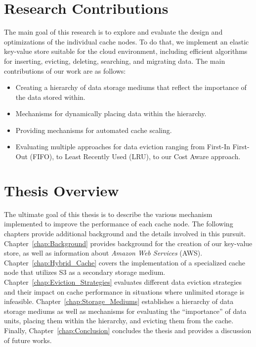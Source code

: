 \section{Research Contributions} %
\label{sec:Research_Contributions}
The main goal of this research is to explore and evaluate the design and
optimizations of the individual cache nodes. To do that, we implement an
elastic key-value store suitable for the cloud environment, including efficient
algorithms for inserting, evicting, deleting, searching, and migrating data.
The main contributions of our work are as follows:
\begin{itemize}
  \item Creating a hierarchy of data storage mediums that reflect the
    importance of the data stored within.
  \item Mechanisms for dynamically placing data within the hierarchy.
  \item Providing mechanisms for automated cache scaling.
  \item Evaluating multiple approaches for data eviction ranging from First-In
    First-Out (FIFO), to Least Recently Used (LRU), to our Cost Aware approach.
\end{itemize}


\section{Thesis Overview} %
\label{sec:Thesis_Overview}
The ultimate goal of this thesis is to describe the various mechanism
implemented to improve the performance of each cache node. The following
chapters provide additional background and the details involved in this
pursuit. Chapter~\ref{chap:Background} provides background for the creation of
our key-value store, as well as information about \emph{Amazon Web Services}
(AWS).  Chapter~\ref{chap:Hybrid_Cache} covers the implementation of a
specialized cache node that utilizes S3 as a secondary storage medium.
Chapter~\ref{chap:Eviction_Strategies} evaluates different data eviction
strategies and their impact on cache performance in situations where unlimited
storage is infeasible. Chapter~\ref{chap:Storage_Mediums} establishes a
hierarchy of data storage mediums as well as mechanisms for evaluating the
``importance'' of data units, placing them within the hierarchy, and evicting
them from the cache. Finally, Chapter~\ref{chap:Conclusion} concludes the
thesis and provides a discussion of future works.


